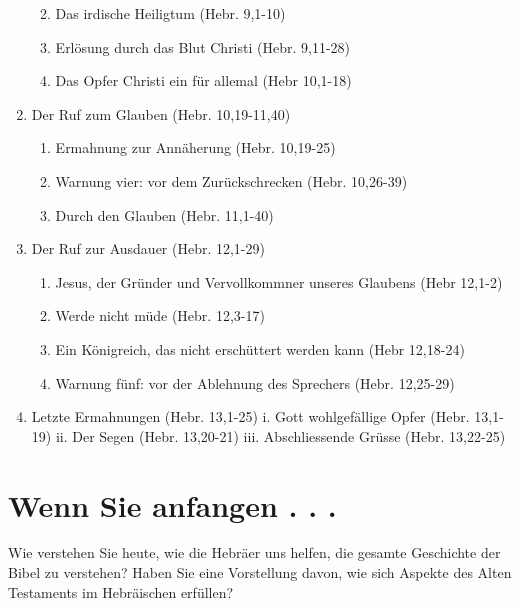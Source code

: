 \documentclass[
  12pt,
]{krantz}
\providecommand{\tightlist}{%
  \setlength{\itemsep}{0pt}\setlength{\parskip}{0pt}}
\begin{document}
\begin{enumerate}
  \begin{enumerate}
  \def\labelenumii{\roman{enumii}.}
  \tightlist
  \item
    Das irdische Heiligtum (Hebr. 9,1-10)
  \item
    Erlösung durch das Blut Christi (Hebr. 9,11-28)
  \item
    Das Opfer Christi ein für allemal (Hebr 10,1-18)
  \end{enumerate}
\item
  Der Ruf zum Glauben (Hebr. 10,19-11,40)

  \begin{enumerate}
  \def\labelenumii{\roman{enumii}.}
  \tightlist
  \item
    Ermahnung zur Annäherung (Hebr. 10,19-25)
  \item
    Warnung vier: vor dem Zurückschrecken (Hebr. 10,26-39)
  \item
    Durch den Glauben (Hebr. 11,1-40)
  \end{enumerate}
\item
  Der Ruf zur Ausdauer (Hebr. 12,1-29)

  \begin{enumerate}
  \def\labelenumii{\roman{enumii}.}
  \tightlist
  \item
    Jesus, der Gründer und Vervollkommner unseres Glaubens (Hebr 12,1-2)
  \item
    Werde nicht müde (Hebr. 12,3-17)
  \item
    Ein Königreich, das nicht erschüttert werden kann (Hebr 12,18-24)
  \item
    Warnung fünf: vor der Ablehnung des Sprechers (Hebr. 12,25-29)
  \end{enumerate}
\item
  Letzte Ermahnungen (Hebr. 13,1-25)
  i. Gott wohlgefällige Opfer (Hebr. 13,1-19)
  ii. Der Segen (Hebr. 13,20-21)
  iii. Abschliessende Grüsse (Hebr. 13,22-25)
\end{enumerate}

\hypertarget{wenn-sie-anfangen-.-.-.}{%
\section{Wenn Sie anfangen . . .}\label{wenn-sie-anfangen-.-.-.}}

Wie verstehen Sie heute, wie die Hebräer uns helfen, die gesamte Geschichte der Bibel zu verstehen? Haben Sie eine Vorstellung davon, wie sich Aspekte des Alten Testaments im Hebräischen erfüllen?
\end{document}
